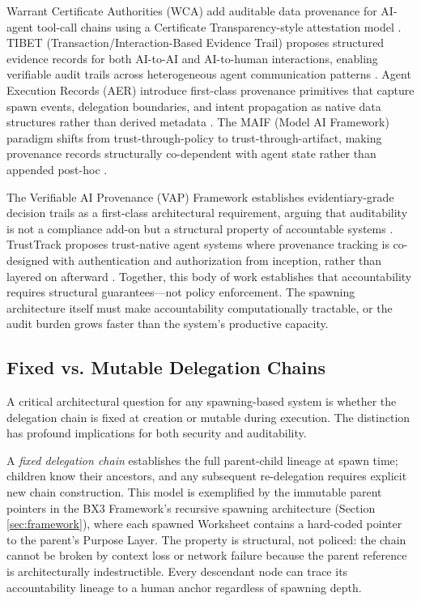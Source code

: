 Warrant Certificate Authorities (WCA) add auditable data provenance for AI-agent tool-call chains using a Certificate Transparency-style attestation model \cite{wca2025}. TIBET (Transaction/Interaction-Based Evidence Trail) proposes structured evidence records for both AI-to-AI and AI-to-human interactions, enabling verifiable audit trails across heterogeneous agent communication patterns \cite{tibet2026}. Agent Execution Records (AER) introduce first-class provenance primitives that capture spawn events, delegation boundaries, and intent propagation as native data structures rather than derived metadata \cite{aer2025}. The MAIF (Model AI Framework) paradigm shifts from trust-through-policy to trust-through-artifact, making provenance records structurally co-dependent with agent state rather than appended post-hoc \cite{maif2025}.

The Verifiable AI Provenance (VAP) Framework establishes evidentiary-grade decision trails as a first-class architectural requirement, arguing that auditability is not a compliance add-on but a structural property of accountable systems \cite{vap2026}. TrustTrack proposes trust-native agent systems where provenance tracking is co-designed with authentication and authorization from inception, rather than layered on afterward \cite{trusttrack2025}. Together, this body of work establishes that accountability requires structural guarantees—not policy enforcement. The spawning architecture itself must make accountability computationally tractable, or the audit burden grows faster than the system's productive capacity.

\subsection{Fixed vs. Mutable Delegation Chains}

A critical architectural question for any spawning-based system is whether the delegation chain is fixed at creation or mutable during execution. The distinction has profound implications for both security and auditability.

A \emph{fixed delegation chain} establishes the full parent-child lineage at spawn time; children know their ancestors, and any subsequent re-delegation requires explicit new chain construction. This model is exemplified by the immutable parent pointers in the BX3 Framework's recursive spawning architecture (Section \ref{sec:framework}), where each spawned Worksheet contains a hard-coded pointer to the parent's Purpose Layer. The property is structural, not policed: the chain cannot be broken by context loss or network failure because the parent reference is architecturally indestructible. Every descendant node can trace its accountability lineage to a human anchor regardless of spawning depth.

